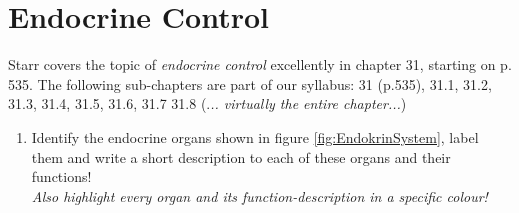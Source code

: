 \begin{comment}
\section*{Endocrine Control}
 \textrightarrow~ discuss the underlying problem an animal body faces to control its interior environment,
	 \begin{itemize}
	  \item anatomical figurines and students shall discuss (in pairs) how the organs could be controled; think about quick and short vs slow and longterm
	  \item discuss diff. concepts: neural signalling vs chemicals in the blood stream
	  \item BB-sketch: cell - bloodstream - cell (like biozone human p.93)
	  \item chemicals in the blood = hormones \textrightarrow~ how can they act at the target?
	 \end{itemize}

\begin{figure}[h]
 \texttt{[image: /images/biozone-human-0093\_v1.jpg]}
\end{figure}

	 
	 
Overview Endocrine System: label the figure
 \newpage
 ...empty page...
\newpage \addtocounter{page}{-2}
\end{comment}


\section{Endocrine Control} \label{sec:EndocrineControl}
 
		\begin{mdframed}[style=exampledefault, userdefinedwidth=15cm, frametitle={Starr 31.1}\label{mat:BEISPIELMATERIAL}]	  
			Starr covers the topic of \emph{endocrine control} excellently in chapter 31, starting on p. 535. The following sub-chapters are part of our syllabus: 31 (p.535), 31.1, 31.2, 31.3, 31.4, 31.5, 31.6, 31.7 31.8 (.\textit{.. virtually the entire chapter...})
		\end{mdframed}

\begin{enumerate}[resume, leftmargin=*]
\item  Identify the endocrine organs shown in figure \ref{fig:EndokrinSystem}, label them and write a short description to each of these organs and their functions! \\ \emph{Also highlight every organ and its function-description in a specific colour!} 
\end{enumerate}


